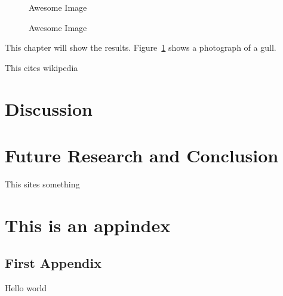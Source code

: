 \documentclass[11pt,twoside,a4paper]{report}
\begin{document}
\begin{figure}[h]
    \centering
    \caption{Awesome Image}
    \label{fig:awesome_image1}
\end{figure}
\begin{figure}[h]
    \centering
    \caption{Awesome Image}
    \label{fig:awesome_image2}
\end{figure}

This chapter will show the results. Figure~\ref{fig:awesome_image1} shows a photograph of a gull.

This \cite{wiki:123} cites wikipedia
\chapter{Discussion}

\chapter{Future Research and Conclusion}
This \cite{amanatides1987fast} sites something




\listoffigures
\listoftables
\appendix
\chapter{This is an appindex}
\section{First Appendix}
Hello world
\end{document}
